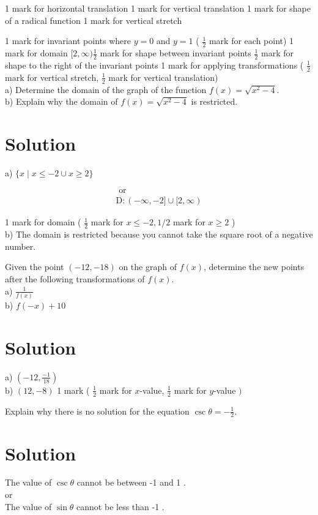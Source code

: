 \documentclass[10pt]{article}
\begin{document}
1 mark for horizontal translation 1 mark for vertical translation 1 mark for shape of a radical function 1 mark for vertical stretch

1 mark for invariant points where $y=0$ and $y=1$ ( $\frac{1}{2}$ mark for each point) 1 mark for domain $[2, \infty) \frac{1}{2}$ mark for shape between invariant points $\frac{1}{2}$ mark for shape to the right of the invariant points 1 mark for applying transformations ( $\frac{1}{2}$ mark for vertical stretch, $\frac{1}{2}$ mark for vertical translation)\\
a) Determine the domain of the graph of the function $f(x)=\sqrt{x^{2}-4}$.\\
b) Explain why the domain of $f(x)=\sqrt{x^{2}-4}$ is restricted.

\section*{Solution}
a) $\{x \mid x \leq-2 \cup x \geq 2\}$

$$
\begin{gathered}
\text { or } \\
\mathrm{D}:(-\infty,-2] \cup[2, \infty)
\end{gathered}
$$

1 mark for domain ( $\frac{1}{2}$ mark for $x \leq-2,1 / 2$ mark for $x \geq 2$ )\\
b) The domain is restricted because you cannot take the square root of a negative number.

Given the point $(-12,-18)$ on the graph of $f(x)$, determine the new points after the following transformations of $f(x)$.\\
a) $\frac{1}{f(x)}$\\
b) $f(-x)+10$

\section*{Solution}
a) $\left(-12, \frac{-1}{18}\right)$\\
b) $(12,-8)$ 1 mark ( $\frac{1}{2}$ mark for $x$-value, $\frac{1}{2}$ mark for $y$-value $)$

Explain why there is no solution for the equation $\csc \theta=-\frac{1}{2}$.

\section*{Solution}
The value of $\csc \theta$ cannot be between -1 and 1 .\\
or\\
The value of $\sin \theta$ cannot be less than -1 .
\end{document}

